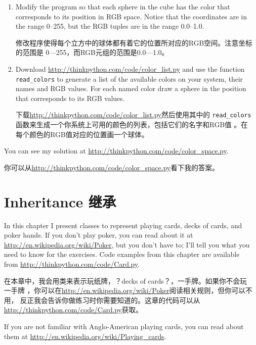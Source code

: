 \documentclass[10pt]{book}
\begin{document}
\begin{CJK}{UTF8}{gbsn}
\begin{exercise}
\begin{enumerate}
\item Modify the program so that each sphere in the cube
has the color that corresponds to its position in RGB space.
Notice that the coordinates are in the range 0--255, but
the RGB tuples are in the range 0.0--1.0.

修改程序使得每个立方中的球体都有着它的位置所对应的RGB空间。注意坐标的范围是
0---255，而RGB元组的范围是0.0---1.0。

\item Download \url{http://thinkpython.com/code/color_list.py}
and use the function \verb"read_colors" to generate a list
of the available colors on your system, their names and
RGB values.  For each named color draw a sphere in the
position that corresponds to its RGB values.

下载\url{http://thinkpython.com/code/color_list.py}然后使用其中的
\verb"read_colors"函数来生成一个你系统上可用的颜色的列表，包括它们的名字和RGB值
。在每个颜色的RGB值对应的位置画一个球体。


\end{enumerate}

You can see my solution at \url{http://thinkpython.com/code/color_space.py}.

你可以从\url{http://thinkpython.com/code/color_space.py}看下我的答案。

\end{exercise}


\chapter{Inheritance 继承}

In this chapter I present classes to represent playing cards,
decks of cards, and poker hands.  If you don't play poker, you can
read about it at \url{http://en.wikipedia.org/wiki/Poker}, but you don't have
to; I'll tell you what you need to know for the exercises.
Code examples from this chapter are available from
\url{http://thinkpython.com/code/Card.py}.

在本章中，我会用类来表示玩纸牌，？decks of cards？，一手牌。如果你不会玩一手牌
，你可以在\url{http://en.wikipedia.org/wiki/Poker}阅读相关规则，但你可以不用，
反正我会告诉你做练习时你需要知道的。这章的代码可以从
\url{http://thinkpython.com/code/Card.py}获取。

If you are not familiar with Anglo-American playing cards,
you can read about them at \url{http://en.wikipedia.org/wiki/Playing_cards}.


\end{CJK}
\end{document}
